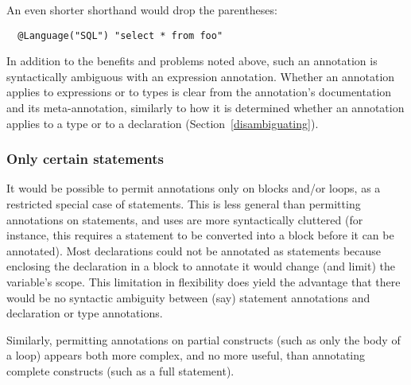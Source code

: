 \documentclass[10pt]{article}
\begin{document}
An even shorter shorthand would drop the parentheses:
\begin{Verbatim}
  @Language("SQL") "select * from foo"
\end{Verbatim}
In addition to the benefits and problems noted above, such an annotation is
syntactically ambiguous with an expression annotation.
Whether an annotation applies to expressions or to types is clear from the
annotation's documentation and its  meta-annotation,
similarly to how it is determined whether an annotation applies to a type
or to a declaration (Section~\ref{disambiguating}).






\subsubsection{Only certain statements\label{locations-subset-of-statements}}

It would be possible to permit annotations only on blocks and/or loops, as
a restricted special case of statements.  This is less general than
permitting annotations on statements, and uses are more syntactically
cluttered (for instance, this requires a statement to be converted into a
block before it can be annotated).  Most declarations could not be
annotated as statements because enclosing the declaration in a block to
annotate it would change (and limit) the variable's scope.  This limitation
in flexibility does yield the advantage that there would be no syntactic
ambiguity between (say) statement annotations and declaration or type
annotations.

Similarly, permitting annotations on partial constructs (such as only the
body of a loop) appears both more complex, and no more useful, than
annotating complete constructs (such as a full statement).
\end{document}
